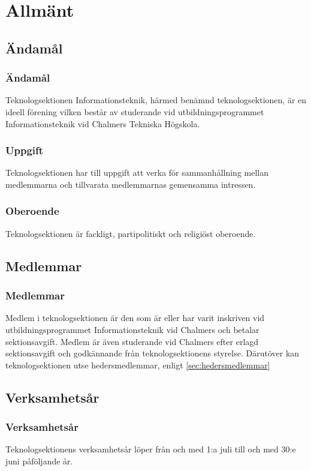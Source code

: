 \section{Allmänt}

\subsection{Ändamål}

\subsubsection{Ändamål}
Teknologsektionen Informationsteknik, härmed benämnd teknologsektionen, är en ideell förening vilken består av studerande vid utbildningsprogrammet Informationsteknik vid Chalmers Tekniska Högskola.

\subsubsection{Uppgift}
Teknologsektionen har till uppgift att verka för sammanhållning mellan medlemmarna och tillvarata medlemmarnas gemensamma intressen.

\subsubsection{Oberoende}
Teknologsektionen är fackligt, partipolitiskt och religiöst oberoende.

\subsection{Medlemmar}

\subsubsection{Medlemmar}
Medlem i teknologsektionen är den som är eller har varit inskriven vid utbildningsprogrammet Informationsteknik vid Chalmers och betalar sektionsavgift. Medlem är även studerande vid Chalmers efter erlagd sektionsavgift och godkännande från teknologsektionens styrelse. Därutöver kan teknologsektionen utse hedersmedlemmar, enligt \ref{sec:hedersmedlemmar}

\subsection{Verksamhetsår}
\subsubsection{Verksamhetsår}
Teknologsektionens verksamhetsår löper från och med 1:a juli till och med 30:e juni påföljande år.